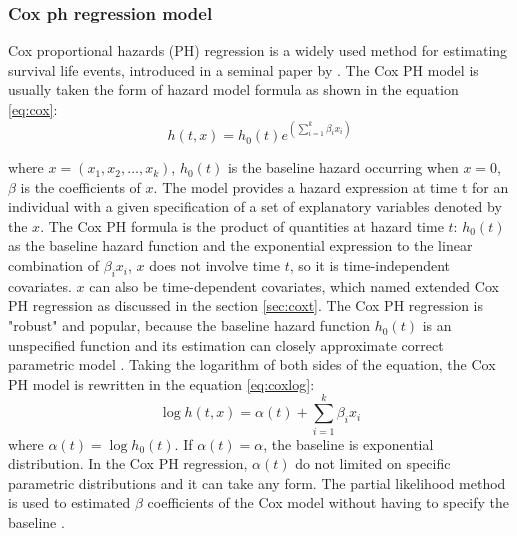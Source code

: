 \documentclass[12pt,letterpaper]{article}
\begin{document}
\subsubsection{Cox ph regression model}

Cox proportional hazards (PH) regression is a widely used method for estimating survival life events, introduced in a seminal paper by \citet{cox1972}. The Cox PH model is usually taken the form of hazard model formula as shown in the equation \ref{eq:cox}:
   \begin{equation}
   \label{eq:cox}
   h(t,x)=h_0(t)e^{(\sum_{i=1}^{k}\beta_ix_i)}
   \end{equation}
   
   where $x=(x_1, x_2, \ldots, x_k)$, $h_0(t)$ is the baseline hazard occurring when $x=0$, $\beta$ is the coefficients of $x$. 
   The model provides a hazard expression at time t for an individual with a given specification of a set of explanatory variables denoted by the $x$. The Cox PH formula is the product of quantities at hazard time $t$: $h_0 (t)$ as the baseline hazard function and the exponential expression to the linear combination of $\beta_i x_i$, $x$ does not involve time $t$, so it is time-independent covariates. $x$ can also be time-dependent covariates, which named extended Cox PH regression as discussed in the section \ref{sec:coxt}. 
   The Cox PH regression is "robust" and popular, because the baseline hazard function $h_0 (t)$ is an unspecified function and its estimation can closely approximate correct parametric model \citep{kleinbaum1998}. Taking the logarithm of both sides of the equation, the Cox PH model is rewritten in the equation \ref{eq:coxlog}:
   \begin{equation}
   \label{eq:coxlog}
   \log{h(t,x)}=\alpha(t)+\sum_{i=1}^{k}\beta_ix_i 
   \end{equation}
   where $\alpha(t)=\log{h_0(t)}$. If $\alpha(t)=\alpha$, the baseline is exponential distribution. In the Cox PH regression, $\alpha(t)$ do not limited on specific parametric distributions and it can take any form. The partial likelihood method is used to estimated $\beta$ coefficients of the Cox model without having to specify the baseline \citep{allison1995}.
  
  
\end{document}
